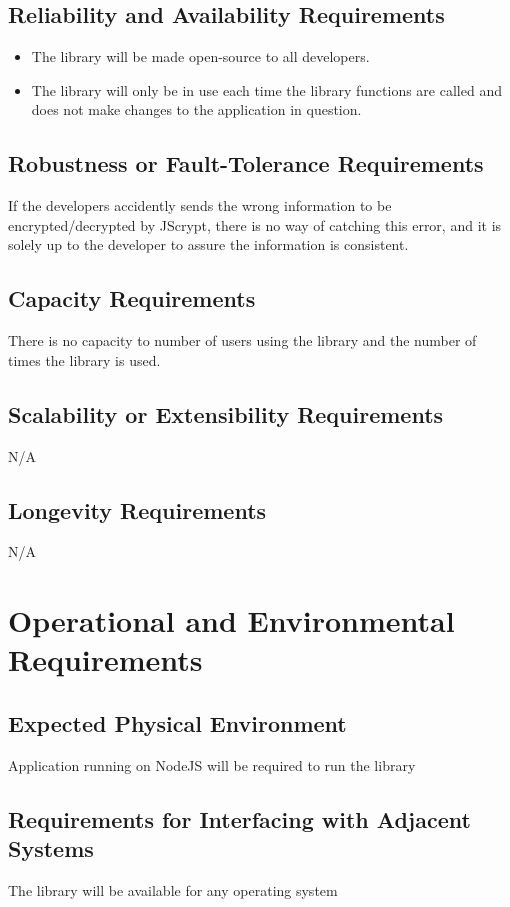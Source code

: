 \documentclass[12pt]{article}
\begin{document}
\subsection {Reliability and Availability Requirements}
\begin{itemize}
	\item The library will be made open-source to all developers.
	\item The library will only be in use each time the library functions are called and does not make changes to the application in question.
\end{itemize}

\subsection {Robustness or Fault-Tolerance Requirements}
If the developers accidently sends the wrong information to be encrypted/decrypted by JScrypt, there is no way of catching this error, and it is solely up to the developer to assure the information is consistent.

\subsection {Capacity Requirements}
There is no capacity to number of users using the library and the number of times the library is used.


\subsection {Scalability or Extensibility Requirements}
N/A

\subsection {Longevity Requirements}
N/A

\section {Operational and Environmental Requirements}

\subsection {Expected Physical Environment}
Application running on NodeJS will be required to run the library

\subsection {Requirements for Interfacing with Adjacent Systems}
The library will be available for any operating system
\end{document}
